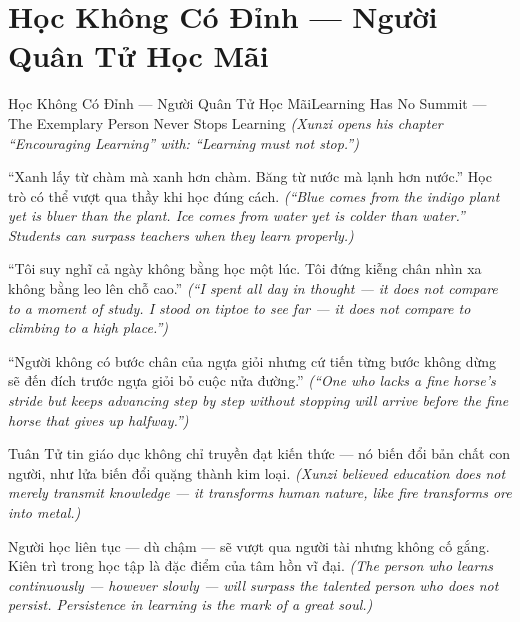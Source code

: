 \section{Học Không Có Đỉnh — Người Quân Tử Học Mãi}
\begin{truyen}{Học Không Có Đỉnh — Người Quân Tử Học Mãi}{Learning Has No Summit — The Exemplary Person Never Stops Learning}
\textit{(Xunzi opens his chapter ``Encouraging Learning'' with: ``Learning must not stop.'')}

``Xanh lấy từ chàm mà xanh hơn chàm. Băng từ nước mà lạnh hơn nước.'' Học trò có thể vượt qua thầy khi học đúng cách.
\textit{(``Blue comes from the indigo plant yet is bluer than the plant. Ice comes from water yet is colder than water.'' Students can surpass teachers when they learn properly.)}

``Tôi suy nghĩ cả ngày không bằng học một lúc. Tôi đứng kiễng chân nhìn xa không bằng leo lên chỗ cao.''
\textit{(``I spent all day in thought — it does not compare to a moment of study. I stood on tiptoe to see far — it does not compare to climbing to a high place.'')}

``Người không có bước chân của ngựa giỏi nhưng cứ tiến từng bước không dừng sẽ đến đích trước ngựa giỏi bỏ cuộc nửa đường.''
\textit{(``One who lacks a fine horse's stride but keeps advancing step by step without stopping will arrive before the fine horse that gives up halfway.'')}

Tuân Tử tin giáo dục không chỉ truyền đạt kiến thức — nó biến đổi bản chất con người, như lửa biến đổi quặng thành kim loại.
\textit{(Xunzi believed education does not merely transmit knowledge — it transforms human nature, like fire transforms ore into metal.)}

\end{truyen}

\begin{baihoc}
Người học liên tục — dù chậm — sẽ vượt qua người tài nhưng không cố gắng. Kiên trì trong học tập là đặc điểm của tâm hồn vĩ đại.
\textit{(The person who learns continuously — however slowly — will surpass the talented person who does not persist. Persistence in learning is the mark of a great soul.)}
\end{baihoc}
\ngancach

